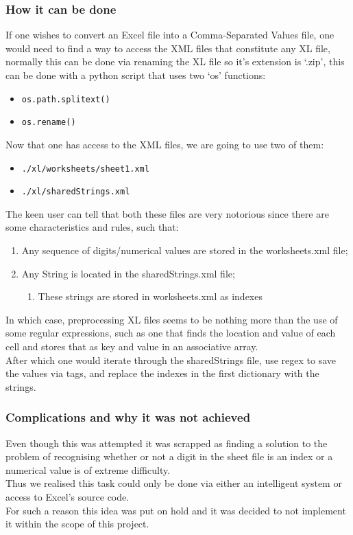\documentclass[11pt,a4paper,times]{report}
\def\CSV{Comma-Separated Values\xspace}
\begin{document}
\subsubsection{How it can be done} If one wishes to convert an Excel file into a
\CSV file, one would need to find a way to access the XML files that constitute
any XL file, normally this can be done via renaming the XL file so it's extension
is `.zip', this can be done with a python script that uses two `os' functions:
\begin{itemize}
    \item \verb|os.path.splitext()|
    \item \verb|os.rename()|
\end{itemize}
Now that one has access to the XML files, we are going to use two of them:
\begin{itemize}
    \item \verb|./xl/worksheets/sheet1.xml|
    \item \verb|./xl/sharedStrings.xml|
\end{itemize}
The keen user can tell that both these files are very notorious since there
are some characteristics and rules, such that:
\begin{enumerate}
    \item Any sequence of digits/numerical values are stored in the worksheets.xml
        file;
    \item Any String is located in the sharedStrings.xml file;
    \begin{enumerate} \item These strings are stored in worksheets.xml as indexes \end{enumerate}
\end{enumerate}
In which case, preprocessing XL files seems to be nothing more than the use of
some regular expressions, such as one that finds the location and value of
each cell and stores that as key and value in an associative array.\\ After which
one would iterate through the sharedStrings file, use regex to save the values
via tags, and replace the indexes in the first dictionary with the strings.
\subsubsection{Complications and why it was not achieved} \label{subsubsection:XLCOMP}
Even though this was attempted it was scrapped as finding a solution to
the problem of recognising whether or not a digit in the sheet file is an
index or a numerical value is of extreme difficulty.\\
Thus we realised this task could only be done via either an intelligent system or
access to Excel's source code. 
\\  For such a reason this idea was put on hold and it was decided to
not implement it within the scope of this project.
\end{document}
